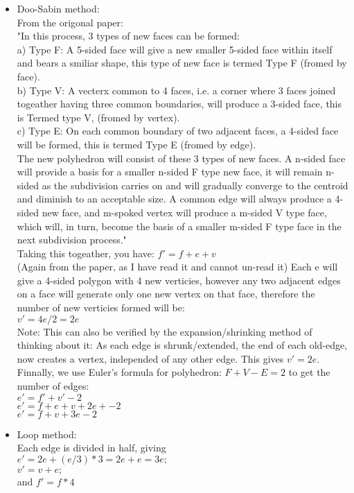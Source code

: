 \begin{itemize}
\item Doo-Sabin method: \\
From the origonal paper: \\
"In this process, 3 types of new faces can be formed: \\
a) Type F: A 5-sided face will give a new smaller 5-sided face within itself and bears a smiliar shape, this type of new face is termed Type F (fromed by face). \\
b) Type V: A vecterx common to 4 faces, i.e. a corner where 3 faces joined togeather having three common boundaries, will produce a 3-sided face, this is Termed type V, (fromed by vertex). \\
c) Type E: On each common boundary of two adjacent faces, a 4-sided face will be formed, this is termed Type E (fromed by edge). \\

  The new polyhedron will consist of these 3 types of new faces. A n-sided face will provide a basis for a smaller n-sided F type new face, it will remain n-sided as the subdivision carries on and will gradually converge to the centroid and diminish to an acceptable size. A common edge will always produce a 4-sided new face, and m-spoked vertex will produce a m-sided V type face, which will, in turn, become the basis of a smaller m-sided F type face in the next subdivision process." \\

Taking this togeather, you have:
$f' = f + e + v$ \\

(Again from the paper, as I have read it and cannot un-read it)
Each e will give a 4-sided polygon with 4 new verticies, however any two adjacent edges on a face will generate only one new vertex on that face, therefore the number of new verticies formed will be: \\
$v' = 4 e / 2 = 2e$ \\
Note: This can also be verified by the expansion/shrinking method of thinking about it: As each edge is shrunk/extended, the end of each old-edge, now creates a vertex, independed of any other edge. This gives $v' = 2e$. \\

Finnally, we use Euler's formula for polyhedron: $F+V-E=2$ to get the number of edges: \\
$e'=f'+v'-2$ \\
$e'=f+e+v + 2e + -2$ \\
$e'= f + v + 3e -2$ \\


\item Loop method: \\
Each edge is divided in half, giving  \\
$e' = 2e + (e/3)*3 = 2e+ e = 3e;$ \\
$v' = v+e;$ \\
and $f' = f*4$ \\
\end{itemize}
